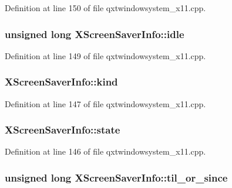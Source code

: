 Definition at line 150 of file qxtwindowsystem\-\_\-x11.\-cpp.

\hypertarget{struct_x_screen_saver_info_a94dbc84476b56e465fbabad5be227182}{
\subsubsection[{idle}]{\setlength{\rightskip}{0pt plus 5cm}unsigned {\bf long} X\-Screen\-Saver\-Info\-::idle}}\label{struct_x_screen_saver_info_a94dbc84476b56e465fbabad5be227182}


Definition at line 149 of file qxtwindowsystem\-\_\-x11.\-cpp.

\hypertarget{struct_x_screen_saver_info_a64a6cdb4051ae07c1374ef5ac30cc2c2}{
\subsubsection[{kind}]{ X\-Screen\-Saver\-Info\-::kind}}\label{struct_x_screen_saver_info_a64a6cdb4051ae07c1374ef5ac30cc2c2}


Definition at line 147 of file qxtwindowsystem\-\_\-x11.\-cpp.

\hypertarget{struct_x_screen_saver_info_a8b78e02613ac59472df6347d6946b71c}{
\subsubsection[{state}]{ X\-Screen\-Saver\-Info\-::state}}\label{struct_x_screen_saver_info_a8b78e02613ac59472df6347d6946b71c}


Definition at line 146 of file qxtwindowsystem\-\_\-x11.\-cpp.

\hypertarget{struct_x_screen_saver_info_aca1addbda62ae2224a8cb99e683ec8fa}{
\subsubsection[{til\-\_\-or\-\_\-since}]{\setlength{\rightskip}{0pt plus 5cm}unsigned {\bf long} X\-Screen\-Saver\-Info\-::til\-\_\-or\-\_\-since}}\label{struct_x_screen_saver_info_aca1addbda62ae2224a8cb99e683ec8fa}


